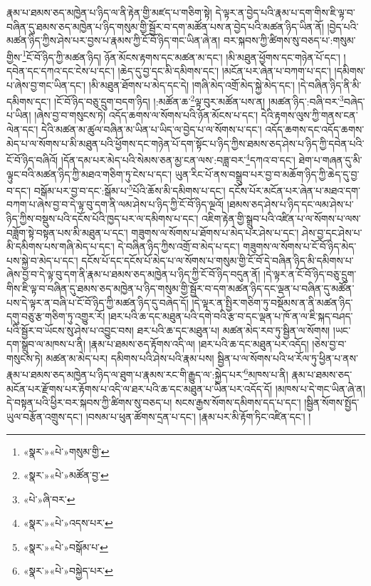 རྣམ་པ་ཐམས་ཅད་མཁྱེན་པ་ཉིད་ལ་ནི་རྟེན་གྱི་མཛད་པ་གཅིག་སྟེ། དེ་ལྟར་ན་བྱེད་པའི་རྣམ་པ་དག་གིས་ཇི་ལྟ་བ་བཞིན་དུ་ཐམས་ཅད་མཁྱེན་པ་ཉིད་གསུམ་གྱི་སྦྱོར་བ་དག་མཚོན་པས་ན་བྱེད་པའི་མཚན་ཉིད་ཡིན་ནོ། །བྱེད་པའི་མཚན་ཉིད་ཀྱིས་ཤེས་པར་བྱས་པ་རྣམས་ཀྱི་ངོ་བོ་ཉིད་གང་ཡིན་ཞེ་ན། བར་སྐབས་ཀྱི་ཚིགས་སུ་བཅད་པ་:གསུམ་གྱིས་\footnote{«སྣར་»«པེ་»གསུམ་གྱི་}ངོ་བོ་ཉིད་ཀྱི་མཚན་ཉིད། ཉོན་མོངས་རྟགས་དང་མཚན་མ་དང་། །མི་མཐུན་ཕྱོགས་དང་གཉེན་པོ་དང་། །དབེན་དང་དཀའ་དང་ངེས་པ་དང་། །ཆེད་དུ་བྱ་དང་མི་དམིགས་དང་། །མངོན་པར་ཞེན་པ་བཀག་པ་དང་། །དམིགས་པ་ཞེས་བྱ་གང་ཡིན་དང་། །མི་མཐུན་ཐོགས་པ་མེད་དང་དེ། །གཞི་མེད་འགྲོ་མེད་སྐྱེ་མེད་དང་། །དེ་བཞིན་ཉིད་ནི་མི་དམིགས་དང་། །ངོ་བོ་ཉིད་བཅུ་དྲུག་བདག་ཉིད། །:མཚོན་ཆ་\footnote{«སྣར་»«པེ་»མཚོན་བྱ་}ལྟ་བུར་མཚོན་པས་ན། །མཚན་ཉིད་:བཞི་བར་\footnote{«པེ་»ཞི་བར་}བཞེད་པ་ཡིན། །ཞེས་བྱ་བ་གསུངས་ཏེ། འདོད་ཆགས་ལ་སོགས་པའི་ཉོན་མོངས་པ་དང་། དེའི་རྟགས་ལུས་ཀྱི་གནས་ངན་ལེན་དང་། དེའི་མཚན་མ་ཚུལ་བཞིན་མ་ཡིན་པ་ཡིད་ལ་བྱེད་པ་ལ་སོགས་པ་དང་། འདོད་ཆགས་དང་འདོད་ཆགས་མེད་པ་ལ་སོགས་པ་མི་མཐུན་པའི་ཕྱོགས་དང་གཉེན་པོ་དག་སྟོང་པ་ཉིད་ཀྱིས་ཐམས་ཅད་ཤེས་པ་ཉིད་ཀྱི་དབེན་པའི་ངོ་བོ་ཉིད་བཞིའོ། །དོན་དམ་པར་མེད་པའི་སེམས་ཅན་མྱ་ངན་ལས་:བཟླ་བར་\footnote{«སྣར་»«པེ་»འདས་པར་}དཀའ་བ་དང་། ཐེག་པ་གཞན་དུ་མི་ལྟུང་བའི་མཚན་ཉིད་ཀྱི་མཐའ་གཅིག་ཏུ་ངེས་པ་དང་། ཡུན་རིང་པོ་ནས་བསྒྲུབ་པར་བྱ་བ་མཆོག་ཉིད་ཀྱི་ཆེད་དུ་བྱ་བ་དང་། བསྒོམ་པར་བྱ་བ་དང་:སྒོམ་པ་\footnote{«སྣར་»«པེ་»བསྒོམ་པ་}པོའི་ཆོས་མི་དམིགས་པ་དང་། དངོས་པོར་མངོན་པར་ཞེན་པ་མཐའ་དག་བཀག་པ་ཞེས་བྱ་བ་དེ་ལྟ་བུ་དག་ནི་ལམ་ཤེས་པ་ཉིད་ཀྱི་ངོ་བོ་ཉིད་ལྔའོ། །ཐམས་ཅད་ཤེས་པ་ཉིད་དང་ལམ་ཤེས་པ་ཉིད་ཀྱིས་བསྡུས་པའི་དངོས་པོའི་ཁྱད་པར་ལ་དམིགས་པ་དང་། འཇིག་རྟེན་གྱི་སྒྲུབ་པའི་འཛིན་པ་ལ་སོགས་པ་ལས་བཟློག་སྟེ་བསྟན་པས་མི་མཐུན་པ་དང་། གཟུགས་ལ་སོགས་པ་ཐོགས་པ་མེད་པར་ཤེས་པ་དང་། ཤེས་བྱ་དང་ཤེས་པ་མི་དམིགས་པས་གཞི་མེད་པ་དང་། དེ་བཞིན་ཉིད་ཀྱིས་འགྲོ་བ་མེད་པ་དང་། གཟུགས་ལ་སོགས་པ་ངོ་བོ་ཉིད་མེད་པས་སྐྱེ་བ་མེད་པ་དང་། དངོས་པོ་དང་དངོས་པོ་མེད་པ་ལ་སོགས་པ་གསུམ་གྱི་ངོ་བོ་དེ་བཞིན་ཉིད་མི་དམིགས་པ་ཞེས་བྱ་བ་དེ་ལྟ་བུ་དག་ནི་རྣམ་པ་ཐམས་ཅད་མཁྱེན་པ་ཉིད་ཀྱི་ངོ་བོ་ཉིད་བདུན་ནོ། །དེ་ལྟར་ན་ངོ་བོ་ཉིད་བཅུ་དྲུག་གིས་ཇི་ལྟ་བ་བཞིན་དུ་ཐམས་ཅད་མཁྱེན་པ་ཉིད་གསུམ་གྱི་སྦྱོར་བ་དག་མཚན་ཉིད་དང་ལྡན་པ་བཞིན་དུ་མཚོན་པས་དེ་ལྟར་ན་བཞི་པ་ངོ་བོ་ཉིད་ཀྱི་མཚན་ཉིད་དུ་བཞེད་དོ། །དེ་ལྟར་ན་སྤྱིར་གཅིག་ཏུ་བསྡོམས་ན་ནི་མཚན་ཉིད་དགུ་བཅུ་རྩ་གཅིག་ཏུ་འགྱུར་རོ། །ཐར་པའི་ཆ་དང་མཐུན་པའི་དགེ་བའི་རྩ་བ་དང་ལྡན་པ་ཁོ་ན་ལ་ཇི་སྐད་བཤད་པའི་སྦྱོར་བ་ཡོངས་སུ་ཤེས་པ་འབྱུང་བས། ཐར་པའི་ཆ་དང་མཐུན་པ། མཚན་མེད་རབ་ཏུ་སྦྱིན་ལ་སོགས། །ཡང་དག་སྒྲུབ་ལ་མཁས་པ་ནི། །རྣམ་པ་ཐམས་ཅད་རྟོགས་འདི་ལ། །ཐར་པའི་ཆ་དང་མཐུན་པར་འདོད། །ཅེས་བྱ་བ་གསུངས་ཏེ། མཚན་མ་མེད་པར། དམིགས་པའི་ཤེས་པའི་རྣམ་པས། སྦྱིན་པ་ལ་སོགས་པའི་ཕ་རོལ་ཏུ་ཕྱིན་པ་ནས་རྣམ་པ་ཐམས་ཅད་མཁྱེན་པ་ཉིད་ལ་ཐུག་པ་རྣམས་རང་གི་རྒྱུད་ལ་:སྐྱེད་པར་\footnote{«སྣར་»«པེ་»བསྐྱེད་པར་}མཁས་པ་ནི། རྣམ་པ་ཐམས་ཅད་མངོན་པར་རྫོགས་པར་རྟོགས་པ་འདི་ལ་ཐར་པའི་ཆ་དང་མཐུན་པ་ཡིན་པར་འདོད་དོ། །མཁས་པ་དེ་གང་ཡིན་ཞེ་ན། དེ་བསྟན་པའི་ཕྱིར་བར་སྐབས་ཀྱི་ཚིགས་སུ་བཅད་པ། སངས་རྒྱས་སོགས་དམིགས་དད་པ་དང་། །སྦྱིན་སོགས་སྤྱོད་ཡུལ་བརྩོན་འགྲུས་དང་། །བསམ་པ་ཕུན་ཚོགས་དྲན་པ་དང་། །རྣམ་པར་མི་རྟོག་ཏིང་འཛིན་དང་། །
